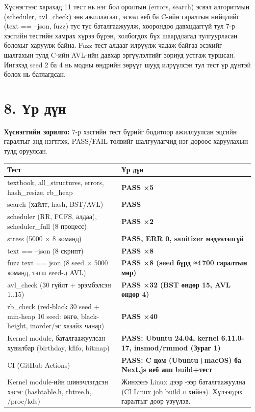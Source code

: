 Хүснэгтээс харахад 11 тест нь нэг бол оролтын (errors, search) эсвэл алгоритмын (scheduler, avl\_check) зөв ажиллагааг, эсвэл веб ба C-ийн гаралтын нийцлийг (text == --json, fuzz) тус тус баталгаажуулж, хоорондоо давхцдаггүй тул 7-р хэсгийн тестийн хамрах хүрээ бүрэн, холбогдох бүх шаардлагад тулгуурласан болохыг харуулж байна. Fuzz тест алдааг илрүүлж чадаж байгаа эсэхийг шалгахын тулд C-ийн AVL-ийн давхар эргүүлэлтийг зориуд устгаж туршсан. Ингэхэд seed 2 ба 4 нь модны өндрийн зөрүүг шууд илрүүлсэн тул тест үр дүнтэй болох нь батлагдсан.

\section*{8. Үр дүн}

\textbf{Хүснэгтийн зорилго:} 7-р хэсгийн тест бүрийг бодитоор ажиллуулсан эцсийн гаралтыг энд нэгтгэж, PASS/FAIL төлвийг шалгуулагчид нэг дороос харуулахын тулд оруулсан.

{\fontsize{9.5}{12}\selectfont
\begin{tabular}{|L{0.55\textwidth}|L{0.40\textwidth}|}
\hline
\textbf{Тест} & \textbf{Үр дүн} \\ \hline
textbook, all\_structures, errors, hash\_resize, rb\_heap & \textbf{PASS ×5} \\ \hline
search (хайлт, hash, BST/AVL) & \textbf{PASS} \\ \hline
scheduler (RR, FCFS, алдаа), scheduler\_full (8 процесс) & \textbf{PASS ×2} \\ \hline
stress (5000 × 8 команд) & \textbf{PASS, ERR 0, sanitizer мэдээлэлгүй} \\ \hline
text == --json (8 скрипт) & \textbf{PASS ×8} \\ \hline
fuzz text == json (8 seed × 5000 команд, тэгш seed-д AVL) & \textbf{PASS ×8 (seed бүрд ≈4\,700 гаралтын мөр)} \\ \hline
avl\_check (30 гүйлт + эрэмбэлсэн 1..15) & \textbf{PASS ×32 (BST өндөр 15, AVL өндөр 4)} \\ \hline
rb\_check (red-black 30 seed + min-heap 10 seed: өнгө, black-height, inorder/эс хазайх чанар) & \textbf{PASS ×40} \\ \hline
Kernel module, баталгаажуулсан хувилбар (birthday, kfifo, bitmap) & \textbf{PASS: Ubuntu 24.04, kernel 6.11.0-17, insmod/rmmod (Зураг 1)} \\ \hline
CI (GitHub Actions) & \textbf{PASS: C цөм (Ubuntu+macOS) ба Next.js веб апп build+тест} \\ \hline
Kernel module-ийн шинэчлэгдсэн хэсэг (hashtable.h, rbtree.h, /proc/kds) & Жинхэнэ Linux дээр -ээр баталгаажуулна (CI Linux job build л хийнэ). Хүлээгдэх гаралтыг доор үзүүлэв. \\ \hline
\end{tabular}
\par}

